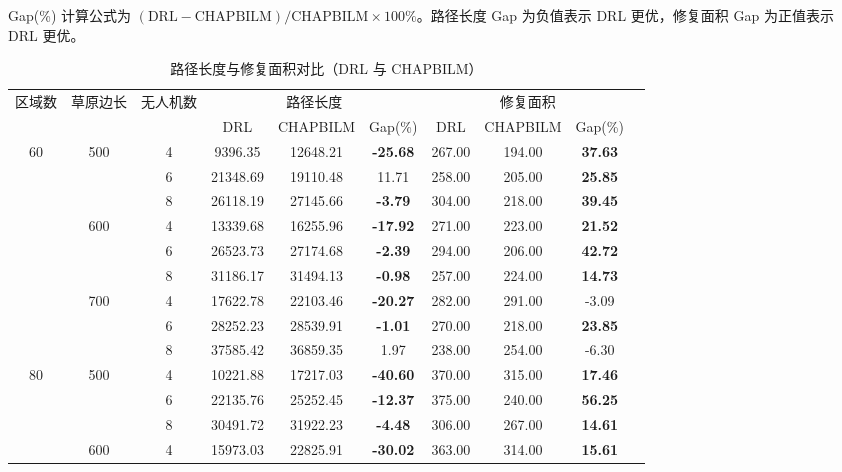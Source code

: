 \documentclass[AutoFakeBold]{LZUThesis}
\begin{document}
Gap(\%) 计算公式为 $(\text{DRL} - \text{CHAPBILM}) / \text{CHAPBILM} \times 100\%$。路径长度 Gap 为负值表示 DRL 更优，修复面积 Gap 为正值表示 DRL 更优。
\begin{table}[H]
	\centering
	\caption{路径长度与修复面积对比（DRL 与 CHAPBILM）}
	\small
	\setlength{\tabcolsep}{3.5pt}
	\begin{tabular}{ccc cccc ccc}
		\toprule
		\multirow{2}{*}{区域数} & \multirow{2}{*}{草原边长} & \multirow{2}{*}{无人机数} & \multicolumn{3}{c}{路径长度} & \multicolumn{3}{c}{修复面积} \\
		\cmidrule(lr){4-6}\cmidrule(lr){7-9}
		& & & DRL & CHAPBILM & Gap(\%) & DRL & CHAPBILM & Gap(\%) \\
		\midrule
		\multirow{9}{*}{60} 
		 & \multirow{3}{*}{500} 
		   & 4 & 9396.35  & 12648.21 & \textbf{-25.68} & 267.00 & 194.00 & \textbf{37.63} \\
		 & & 6 & 21348.69 & 19110.48 & 11.71          & 258.00 & 205.00 & \textbf{25.85} \\
		 & & 8 & 26118.19 & 27145.66 & \textbf{-3.79} & 304.00 & 218.00 & \textbf{39.45} \\
		\cmidrule(lr){2-9}
		 & \multirow{3}{*}{600} 
		   & 4 & 13339.68 & 16255.96 & \textbf{-17.92} & 271.00 & 223.00 & \textbf{21.52} \\
		 & & 6 & 26523.73 & 27174.68 & \textbf{-2.39} & 294.00 & 206.00 & \textbf{42.72} \\
		 & & 8 & 31186.17 & 31494.13 & \textbf{-0.98} & 257.00 & 224.00 & \textbf{14.73} \\
		\cmidrule(lr){2-9}
		 & \multirow{3}{*}{700} 
		   & 4 & 17622.78 & 22103.46 & \textbf{-20.27} & 282.00 & 291.00 & -3.09          \\
		 & & 6 & 28252.23 & 28539.91 & \textbf{-1.01} & 270.00 & 218.00 & \textbf{23.85} \\
		 & & 8 & 37585.42 & 36859.35 & 1.97           & 238.00 & 254.00 & -6.30          \\
		\midrule
		\multirow{9}{*}{80} 
		 & \multirow{3}{*}{500} 
		   & 4 & 10221.88 & 17217.03 & \textbf{-40.60} & 370.00 & 315.00 & \textbf{17.46} \\
		 & & 6 & 22135.76 & 25252.45 & \textbf{-12.37} & 375.00 & 240.00 & \textbf{56.25} \\
		 & & 8 & 30491.72 & 31922.23 & \textbf{-4.48}  & 306.00 & 267.00 & \textbf{14.61} \\
		\cmidrule(lr){2-9}
		 & \multirow{3}{*}{600} 
		   & 4 & 15973.03 & 22825.91 & \textbf{-30.02} & 363.00 & 314.00 & \textbf{15.61} \\

\end{tabular}
\end{table}
\end{document}
